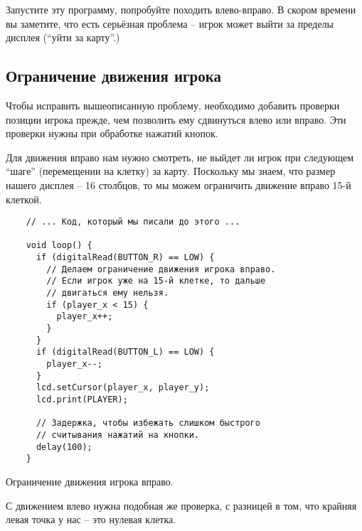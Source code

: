 \documentclass[../sparc.tex]{subfiles}
\begin{document}
Запустите эту программу, попробуйте походить влево-вправо.  В скором времени вы
заметите, что есть серьёзная проблема -- игрок может выйти за пределы дисплея
(``уйти за карту''.)

\subsection{Ограничение движения игрока}

Чтобы исправить вышеописанную проблему, необходимо добавить проверки позиции
игрока прежде, чем позволить ему сдвинуться влево или вправо.  Эти проверки
нужны при обработке нажатий кнопок.

Для движения вправо нам нужно смотреть, не выйдет ли игрок при следующем
``шаге'' (перемещении на клетку) за карту.  Поскольку мы знаем, что размер
нашего дисплея -- 16 столбцов, то мы можем ограничить движение вправо 15-й
клеткой.

\begin{listing}[H]
  \begin{verbatim}
    // ... Код, который мы писали до этого ...

    void loop() {
      if (digitalRead(BUTTON_R) == LOW) {
        // Делаем ограничение движения игрока вправо.
        // Если игрок уже на 15-й клетке, то дальше
        // двигаться ему нельзя.
        if (player_x < 15) {
          player_x++;
        }
      }
      if (digitalRead(BUTTON_L) == LOW) {
        player_x--;
      }
      lcd.setCursor(player_x, player_y);
      lcd.print(PLAYER);

      // Задержка, чтобы избежать слишком быстрого
      // считывания нажатий на кнопки.
      delay(100);
    }
  \end{verbatim}
  \caption{Ограничение движения игрока вправо.}
  \label{listing:game-dev-player-right--constrain}
\end{listing}

С движением влево нужна подобная же проверка, с разницей в том, что крайняя
левая точка у нас -- это нулевая клетка.
\end{document}
